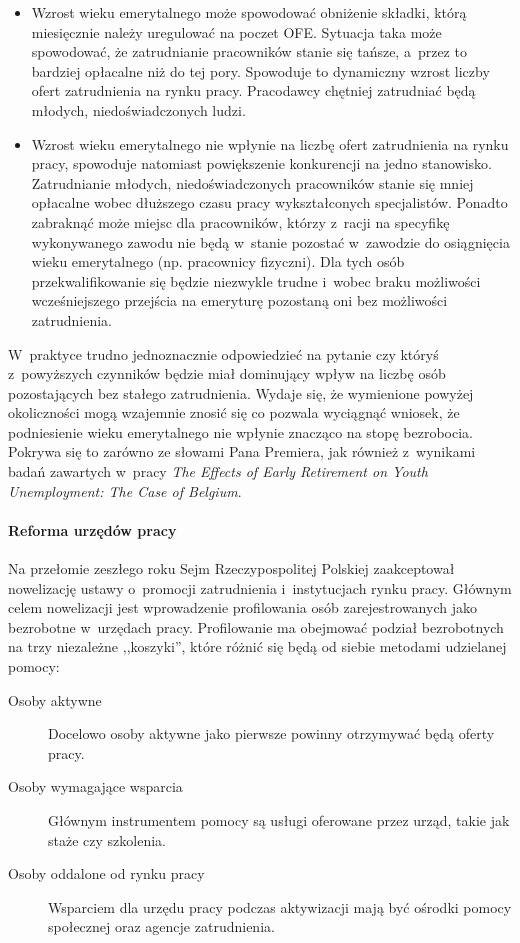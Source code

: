 \documentclass[12pt]{article}
\begin{document}
    \begin{itemize}
        \item Wzrost wieku emerytalnego może spowodować obniżenie składki, którą miesięcznie należy uregulować na poczet OFE. Sytuacja taka może spowodować, że zatrudnianie pracowników stanie się tańsze, a~przez to bardziej opłacalne niż do tej pory. Spowoduje to dynamiczny wzrost liczby ofert zatrudnienia na rynku pracy. Pracodawcy chętniej zatrudniać będą młodych, niedoświadczonych ludzi.
        \item Wzrost wieku emerytalnego nie wpłynie na liczbę ofert zatrudnienia na rynku pracy, spowoduje natomiast powiększenie konkurencji na jedno stanowisko. Zatrudnianie młodych, niedoświadczonych pracowników stanie się mniej opłacalne wobec dłuższego czasu pracy wykształconych specjalistów. Ponadto zabraknąć może miejsc dla pracowników, którzy z~racji na specyfikę wykonywanego zawodu nie będą w~stanie pozostać w~zawodzie do osiągnięcia wieku emerytalnego (np. pracownicy fizyczni). Dla tych osób przekwalifikowanie się będzie niezwykle trudne i~wobec braku możliwości wcześniejszego przejścia na emeryturę pozostaną oni bez możliwości zatrudnienia. 
    \end{itemize}
 
    W~praktyce trudno jednoznacznie odpowiedzieć na pytanie czy któryś z~powyższych czynników będzie miał dominujący wpływ na liczbę osób pozostających bez stałego zatrudnienia. Wydaje się, że wymienione powyżej okoliczności mogą wzajemnie znosić się co pozwala wyciągnąć wniosek, że podniesienie wieku emerytalnego nie wpłynie znacząco na stopę bezrobocia. Pokrywa się to zarówno ze słowami Pana Premiera, jak również z~wynikami badań zawartych w~pracy \emph{The Effects of Early Retirement on Youth Unemployment: The Case of Belgium}\cite{imf}.
    
    \paragraph{Reforma urzędów pracy}
    
    Na przełomie zeszłego roku Sejm Rzeczypospolitej Polskiej zaakceptował nowelizację ustawy o~promocji zatrudnienia i~instytucjach rynku pracy\cite{dz:u}. Głównym celem nowelizacji jest wprowadzenie profilowania osób zarejestrowanych jako bezrobotne w~urzędach pracy. Profilowanie ma obejmować podział bezrobotnych na trzy niezależne ,,koszyki'', które różnić się będą od siebie metodami udzielanej pomocy:
    
    \begin{description}
        \item[Osoby aktywne] Docelowo osoby aktywne jako pierwsze powinny otrzymywać będą oferty pracy. 
        \item[Osoby wymagające wsparcia] Głównym instrumentem pomocy są usługi oferowane przez urząd, takie jak staże czy szkolenia.
        \item[Osoby oddalone od rynku pracy] Wsparciem dla urzędu pracy podczas aktywizacji mają być ośrodki pomocy społecznej oraz agencje zatrudnienia.
    \end{description}
\end{document}
